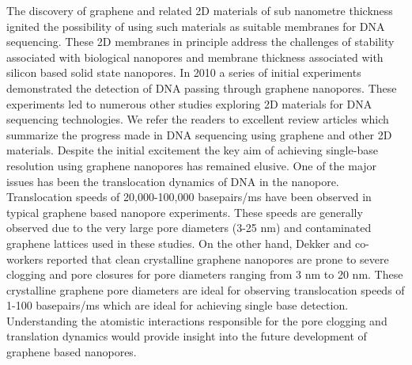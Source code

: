 The discovery of graphene\supercite{geim_graphene_2009} and related 2D materials\supercite{novoselov_two-dimensional_2005} of sub nanometre thickness ignited the possibility of using such materials as suitable membranes for DNA sequencing. These 2D membranes in principle address the challenges of stability associated with biological nanopores\supercite{mayer_biological_2022} and membrane thickness associated with silicon based solid state nanopores.\supercite{li_dna_2003} In 2010 a series of initial experiments demonstrated the detection of DNA passing through graphene nanopores.\supercite{schneider_dna_2010,merchant_dna_2010,garaj_graphene_2010} These experiments led to numerous other studies exploring 2D materials for DNA sequencing technologies. We refer the readers to excellent review articles which summarize the progress made in DNA sequencing using graphene and other 2D materials.\supercite{xue_solid-state_2020,qiu_nanopores_2021} Despite the initial excitement the key aim of achieving single-base resolution using graphene nanopores has remained elusive. One of the major issues has been the translocation dynamics of DNA in the nanopore.\supercite{venkatesan_nanopore_2011} Translocation speeds of 20,000-100,000 basepairs/ms have been observed in typical graphene based nanopore experiments. These speeds are generally observed due to the very large pore diameters (3-25 nm)\supercite{schneider_dna_2010,merchant_dna_2010,garaj_graphene_2010} and contaminated graphene lattices used in these studies. On the other hand, Dekker and co-workers reported that clean crystalline graphene nanopores are prone to severe clogging and pore closures for pore diameters ranging from 3 nm to 20 nm.\supercite{schneider_tailoring_2013} These crystalline graphene pore diameters are ideal for observing translocation speeds of 1-100 basepairs/ms which are ideal for achieving single base detection. Understanding the atomistic interactions responsible for the pore clogging and translation dynamics would provide insight into the future development of graphene based nanopores.

